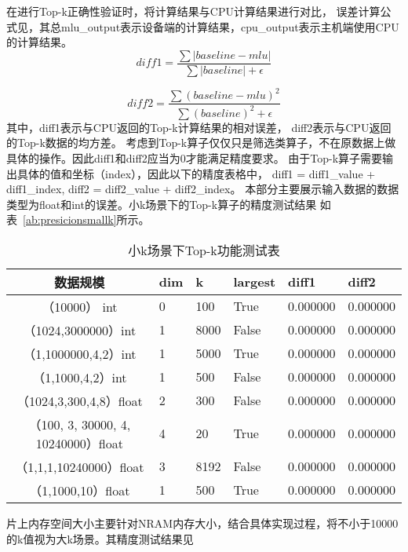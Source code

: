 在进行Top-k正确性验证时，将计算结果与CPU计算结果进行对比，
误差计算公式见，其总mlu\_output表示设备端的计算结果，cpu\_output表示主机端使用CPU的计算结果。
    \begin{equation}
    \label{eq:diff1}
    diff1 = \frac{\sum \vert baseline - mlu \vert}{\sum \vert baseline \vert + \epsilon}
    \end{equation}
    
    \begin{equation}
    \label{eq:diff2}
    diff2 = \frac{\sum (baseline - mlu)^2}{\sum (baseline)^2 + \epsilon}
    \end{equation}
其中，diff1表示与CPU返回的Top-k计算结果的相对误差，
diff2表示与CPU返回的Top-k数据的均方差。
考虑到Top-k算子仅仅只是筛选类算子，不在原数据上做具体的操作。因此diff1和diff2应当为0才能满足精度要求。
由于Top-k算子需要输出具体的值和坐标（index），因此以下的精度表格中，
diff1 = diff1\_value + diff1\_index,
diff2 = diff2\_value + diff2\_index。
本部分主要展示输入数据的数据类型为float和int的误差。小k场景下的Top-k算子的精度测试结果
如表~\ref{ab:presicionsmallk}所示。
\begin{table}
\centering
\caption{小k场景下Top-k功能测试表}
\label{tab:presicionsmallk}
\begin{tabular}{clllll}
    \toprule
    数据规模      &dim   & k  & largest & diff1    & diff2 \\
    \midrule
    （10000） int &0  & 100      & True      & 0.000000 & 0.000000 \\
    （1024,3000000）int&1 & 8000 & False      & 0.000000 & 0.000000 \\
    （1,1000000,4,2）int &1  & 5000 & True      & 0.000000 & 0.000000 \\
    （1,1000,4,2）int &1  & 500 & False      & 0.000000 & 0.000000 \\
    
    （1024,3,300,4,8）float&2 & 300 & False      & 0.000000 & 0.000000 \\
    （100, 3, 30000, 4, 10240000）float&4 & 20 & True      & 0.000000 & 0.000000 \\
    （1,1,1,10240000）float & 3 & 8192 & False      & 0.000000 & 0.000000 \\
    （1,1000,10）float & 1  & 500 & True      & 0.000000 & 0.000000 \\
    
\bottomrule
\end{tabular}
\end{table}
片上内存空间大小主要针对NRAM内存大小，结合具体实现过程，将不小于10000的k值视为大k场景。其精度测试结果见
